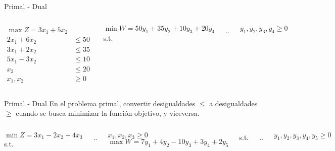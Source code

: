 \begin{frameExample}{Primal - Dual}{}
  \begin{columns}
        \begin{align*}
      \max Z = 3x_1 + 5x_2 & \\[3mm]
    2x_1 + 6x_2 & \leq 50\\
    3x_1 + 2x_2 & \leq 35\\
    5x_1 - 3x_2 & \leq 10\\
    x_2 & \leq 20\\[5mm]
    x_1, x_2 & \geq 0
        \end{align*}
        
                 \[      \min W = 50y_1 + 35y_2  + 10y_3 + 20y_4  \]
                 s.t.
                 \vspace{3mm}

                 \sysdelim..%

  \vspace{5mm}
  $    y_1, y_2, y_3, y_4  \geq 0$
  \end{columns}
\end{frameExample} 


\begin{frameExample}{Primal - Dual}{}
En el problema primal, convertir desigualdades $\leq$ a desigualdades $\geq$ cuando se busca \alert{minimizar} la función objetivo, y viceversa.
  \begin{columns}
\[      \min Z = 3x_1 - 2x_2 + 4x_3  \]
s.t. \vspace{4mm}

\sysdelim..%

          $    x_1, x_2, x_3  \geq 0$
    \[      \max W = 7y_1 + 4y_2  - 10y_3 + 3y_4 + 2y_5  \]
    
    s.t.
    \vspace{4mm}

    \sysdelim.. %

  \vspace{5mm}
  $    y_1, y_2, y_3, y_4, y_5  \geq 0$
  \end{columns}
\end{frameExample}


